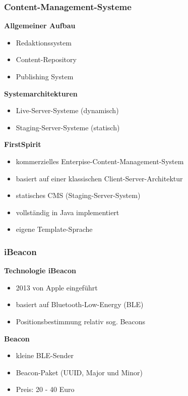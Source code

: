 \documentclass{beamer}
\begin{document}
\begin{frame}
\frametitle<presentation>{Content-Management-Systeme}

\textbf{Allgemeiner Aufbau}

\begin{itemize}
  \item Redaktionssystem
  \item Content-Repository
  \item Publishing System
\end{itemize}

\textbf{Systemarchitekturen}

\begin{itemize}
  \item Live-Server-Systeme (dynamisch)
  \item Staging-Server-Systeme (statisch)
\end{itemize}

\textbf{FirstSpirit}

\begin{itemize}
  \item kommerzielles Enterpise-Content-Management-System
  \item basiert auf einer klassischen Client-Server-Architektur
  \item statisches CMS (Staging-Server-System)
  \item vollständig in Java implementiert
  \item eigene Template-Sprache
\end{itemize}

\end{frame}

\begin{frame}
\frametitle<presentation>{iBeacon}

\textbf{Technologie iBeacon}

\begin{itemize}
  \item 2013 von Apple eingeführt
  \item basiert auf Bluetooth-Low-Energy (BLE)
  \item Positionsbestimmung relativ sog. Beacons
\end{itemize}

\textbf{Beacon}

  \begin{itemize}
  \item kleine BLE-Sender
  \item Beacon-Paket (UUID, Major und Minor)
  \item Preis: 20 - 40 Euro 
\end{itemize}

\end{frame}
\end{document}
